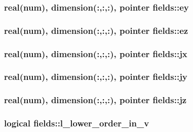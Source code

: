 \subsubsection[{\texorpdfstring{ey}{ey}}]{\setlength{\rightskip}{0pt plus 5cm}real(num), dimension(\+:,\+:,\+:), pointer fields\+::ey}\hypertarget{namespacefields_a416c4dba2dc5fb0ac7cbeb6bdbaffc2c}{}\label{namespacefields_a416c4dba2dc5fb0ac7cbeb6bdbaffc2c}
\subsubsection[{\texorpdfstring{ez}{ez}}]{\setlength{\rightskip}{0pt plus 5cm}real(num), dimension(\+:,\+:,\+:), pointer fields\+::ez}\hypertarget{namespacefields_a0fa6f30ad153ef0e52f181d70e3b92e1}{}\label{namespacefields_a0fa6f30ad153ef0e52f181d70e3b92e1}
\subsubsection[{\texorpdfstring{jx}{jx}}]{\setlength{\rightskip}{0pt plus 5cm}real(num), dimension(\+:,\+:,\+:), pointer fields\+::jx}\hypertarget{namespacefields_ab4aadb2986a77b2c2546cee63c380fca}{}\label{namespacefields_ab4aadb2986a77b2c2546cee63c380fca}
\subsubsection[{\texorpdfstring{jy}{jy}}]{\setlength{\rightskip}{0pt plus 5cm}real(num), dimension(\+:,\+:,\+:), pointer fields\+::jy}\hypertarget{namespacefields_aacf6032b8f949c35388351665b007c93}{}\label{namespacefields_aacf6032b8f949c35388351665b007c93}
\subsubsection[{\texorpdfstring{jz}{jz}}]{\setlength{\rightskip}{0pt plus 5cm}real(num), dimension(\+:,\+:,\+:), pointer fields\+::jz}\hypertarget{namespacefields_ad1f49be91f74095a76edaa8ff8c26c8c}{}\label{namespacefields_ad1f49be91f74095a76edaa8ff8c26c8c}
\subsubsection[{\texorpdfstring{l\+\_\+lower\+\_\+order\+\_\+in\+\_\+v}{l_lower_order_in_v}}]{\setlength{\rightskip}{0pt plus 5cm}logical fields\+::l\+\_\+lower\+\_\+order\+\_\+in\+\_\+v}\hypertarget{namespacefields_a5a24e83e3fb185459ab237b37188c1d8}{}\label{namespacefields_a5a24e83e3fb185459ab237b37188c1d8}
